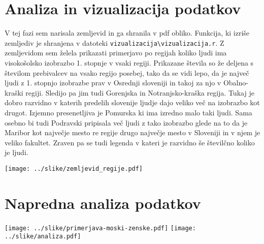 \documentclass[11pt,a4paper]{article}
\begin{document}
\section{Analiza in vizualizacija podatkov}
V tej fazi sem narisala zemljevid in ga shranila v pdf obliko. Funkcija, ki izriše zemljediv je shranjena v datoteki \verb|vizualizacija\vizualizacija.r|. Z zemljevidom sem želela prikazati primerjavo po regijah koliko ljudi ima visokošolsko izobrazbo 1. stopnje v vsaki regiji. Prikazane števila so že deljena s številom prebivalcev na vsako regijo posebej, tako da se vidi lepo, da je največ ljudi z 1. stopnjo izobrazbe prav v Osrednji sloveniji in takoj za njo v Obalno- kraški regiji. Sledijo pa jim tudi Gorenjska in Notranjsko-kraška regija. Tukaj je dobro razvidno v katerih predelih slovenije ljudje dajo veliko več na izobrazbo kot drugot. Izjemno presenetljiva je Pomurska ki ima izredno malo taki ljudi. Sama osebno bi tudi Podravski pripisala več ljudi z tako izobrazbo glede na to da je Maribor kot največje mesto re regije drugo največje mesto v Sloveniji in v njem je veliko fakultet.  Zraven pa se tudi legenda v kateri je razvidno še številčno koliko je ljudi.

\texttt{[image: ../slike/zemljevid\_regije.pdf]}

\section{Napredna analiza podatkov}

\texttt{[image: ../slike/primerjava-moski-zenske.pdf]}
\texttt{[image: ../slike/analiza.pdf]}
\end{document}
